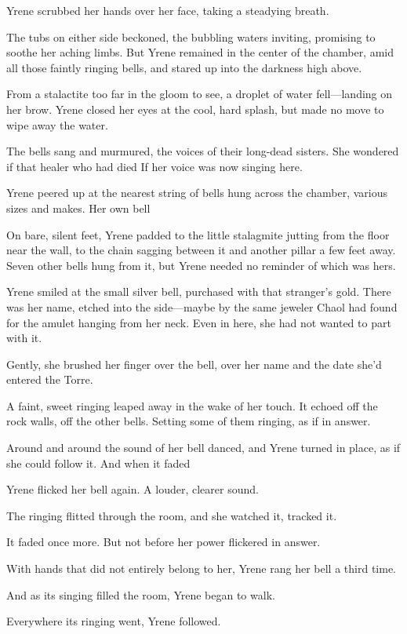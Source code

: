 Yrene scrubbed her hands over her face, taking a steadying breath.

The tubs on either side beckoned, the bubbling waters inviting, promising to soothe her aching limbs. But Yrene remained in the center of the chamber, amid all those faintly ringing bells, and stared up into the darkness high above.

From a stalactite too far in the gloom to see, a droplet of water fell---landing on her brow. Yrene closed her eyes at the cool, hard splash, but made no move to wipe away the water.

The bells sang and murmured, the voices of their long-dead sisters. She wondered if that healer who had died  If her voice was now singing here.

Yrene peered up at the nearest string of bells hung across the chamber, various sizes and makes. Her own bell 

On bare, silent feet, Yrene padded to the little stalagmite jutting from the floor near the wall, to the chain sagging between it and another pillar a few feet away. Seven other bells hung from it, but Yrene needed no reminder of which was hers.

Yrene smiled at the small silver bell, purchased with that stranger's gold. There was her name, etched into the side---maybe by the same jeweler Chaol had found for the amulet hanging from her neck. Even in here, she had not wanted to part with it.

Gently, she brushed her finger over the bell, over her name and the date she'd entered the Torre.

A faint, sweet ringing leaped away in the wake of her touch. It echoed off the rock walls, off the other bells. Setting some of them ringing, as if in answer.

Around and around the sound of her bell danced, and Yrene turned in place, as if she could follow it. And when it faded 

Yrene flicked her bell again. A louder, clearer sound.

The ringing flitted through the room, and she watched it, tracked it.

It faded once more. But not before her power flickered in answer.

With hands that did not entirely belong to her, Yrene rang her bell a third time.

And as its singing filled the room, Yrene began to walk.

Everywhere its ringing went, Yrene followed.

